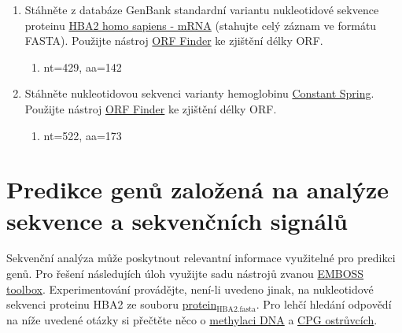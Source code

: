 \documentclass[11pt]{article}
\begin{document}
\begin{enumerate}
\item Stáhněte z databáze GenBank standardní variantu nukleotidové sekvence
proteinu \href{http://www.ncbi.nlm.nih.gov/nuccore/NM\_000517.4}{HBA2 homo sapiens - mRNA} (stahujte celý záznam ve formátu
FASTA). Použijte nástroj \href{https://www.ncbi.nlm.nih.gov/orffinder/}{ORF Finder} ke zjištění délky ORF.
\begin{enumerate}
\item nt=429, aa=142
\end{enumerate}
\item Stáhněte nukleotidovou sekvenci varianty hemoglobinu \href{./constant\_spring\_rna.txt}{Constant
Spring}. Použijte nástroj \href{https://www.ncbi.nlm.nih.gov/orffinder/}{ORF Finder} ke zjištění délky ORF.
\begin{enumerate}
\item nt=522, aa=173
\end{enumerate}
\end{enumerate}

\section{Predikce genů založená na analýze sekvence a sekvenčních signálů}
\label{sec:org3ab26c2}
Sekvenční analýza může poskytnout relevantní informace využitelné pro predikci
genů. Pro řešení následujích úloh využijte sadu nástrojů zvanou \href{http://emboss.bioinformatics.nl}{EMBOSS
toolbox}. Experimentování provádějte, není-li uvedeno jinak, na nukleotidové
sekvenci proteinu HBA2 ze souboru \href{./protein\_HBA2.fasta}{protein\(_{\text{HBA2.fasta}}\)}. Pro lehčí hledání odpovědí
na níže uvedené otázky si přečtěte něco o \href{https://cs.wikipedia.org/wiki/Methylace\_DNA}{methylaci DNA} a \href{https://en.wikipedia.org/wiki/CpG\_site\#CpG\_islands}{CPG ostrůvcích}.
\end{document}
